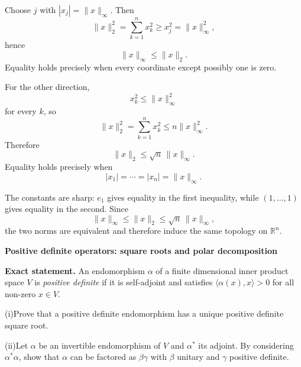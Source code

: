 \begin{solution}
Choose \(j\) with \(|x_j|=\|x\|_\infty\). Then
\[
\|x\|_2^2=\sum_{k=1}^{n}x_k^2\ge x_j^2=\|x\|_\infty^2,
\]
hence
\[
\|x\|_\infty\le \|x\|_2.
\]
Equality holds precisely when every coordinate except possibly one is zero.

For the other direction,
\[
x_k^2\le \|x\|_\infty^2
\]
for every \(k\), so
\[
\|x\|_2^2=\sum_{k=1}^{n}x_k^2
\le n\|x\|_\infty^2.
\]
Therefore
\[
\|x\|_2\le \sqrt n\,\|x\|_\infty.
\]
Equality holds precisely when
\[
|x_1|=\cdots=|x_n|=\|x\|_\infty.
\]

The constants are sharp: \(e_1\) gives equality in the first inequality, while
\((1,\dots,1)\) gives equality in the second. Since
\[
\|x\|_\infty\le \|x\|_2\le \sqrt n\,\|x\|_\infty,
\]
the two norms are equivalent and therefore induce the same topology on \(\mathbb{R}^n\).
\end{solution}

\begin{problem}[CP-I-0073]
\label{prob:cp-i-0073}
\textbf{Positive definite operators: square roots and polar decomposition}

\textbf{Exact statement.}
\hspace*{1.5em}An endomorphism $\alpha$ of a finite dimensional inner product space $V$ is \emph{positive definite} if it is self-adjoint and satisfies
$\langle \alpha(x),x\rangle>0$ for all non-zero $x\in V$.

	\par\noindent (i)\quad Prove that a positive definite endomorphism has a unique positive definite square root.
	\par\noindent (ii)\quad Let $\alpha$ be an invertible endomorphism of $V$ and $\alpha^*$ its adjoint. By considering $\alpha^*\alpha$, show that $\alpha$
	can be factored as $\beta\gamma$ with $\beta$ unitary and $\gamma$ positive definite.

\end{problem}

